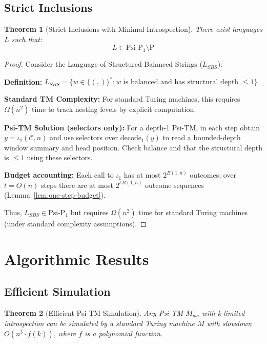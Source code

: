 \documentclass[11pt]{article}
\newtheorem{theorem}{Theorem}
\begin{document}
\subsection{Strict Inclusions}

\begin{theorem}[Strict Inclusions with Minimal Introspection]
There exist languages $L$ such that:
$$L \in \text{Psi-P}_1 \setminus \text{P}$$
\end{theorem}

\begin{proof}
Consider the Language of Structured Balanced Strings ($L_{SBS}$):

\textbf{Definition:} $L_{SBS} = \{w \in \{(,)\}^* : w \text{ is balanced and has structural depth } \leq 1\}$

\textbf{Standard TM Complexity:}
For standard Turing machines, this requires $\Omega(n^2)$ time to track nesting levels by explicit computation.

\textbf{Psi-TM Solution (selectors only):}
For a depth-1 Psi-TM, in each step obtain $y=\iota_1(\mathcal{C},n)$ and use selectors over $\mathrm{decode}_1(y)$ to read a bounded-depth window summary and head position. Check balance and that the structural depth is $\le 1$ using these selectors.

\textbf{Budget accounting:}
Each call to $\iota_1$ has at most $2^{B(1,n)}$ outcomes; over $t=O(n)$ steps there are at most $2^{t\,B(1,n)}$ outcome sequences (Lemma~\ref{lem:one-step-budget}).

Thus, $L_{SBS} \in \text{Psi-P}_1$ but requires $\Omega(n^2)$ time for standard Turing machines (under standard complexity assumptions).
\end{proof}

\section{Algorithmic Results}

\subsection{Efficient Simulation}

\begin{theorem}[Efficient Psi-TM Simulation]
Any Psi-TM $M_{psi}$ with k-limited introspection can be simulated by a standard Turing machine $M$ with slowdown $O(n^3 \cdot f(k))$, where $f$ is a polynomial function.
\end{theorem}
\end{document}
